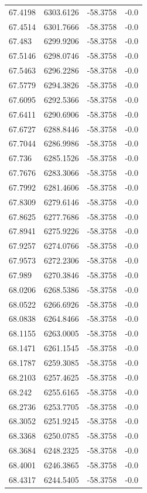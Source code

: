 \begin{table}[H]
\begin{tabular}{llll}
67.4198 & 6303.6126 & -58.3758 & -0.0 \\
67.4514 & 6301.7666 & -58.3758 & -0.0 \\
67.483 & 6299.9206 & -58.3758 & -0.0 \\
67.5146 & 6298.0746 & -58.3758 & -0.0 \\
67.5463 & 6296.2286 & -58.3758 & -0.0 \\
67.5779 & 6294.3826 & -58.3758 & -0.0 \\
67.6095 & 6292.5366 & -58.3758 & -0.0 \\
67.6411 & 6290.6906 & -58.3758 & -0.0 \\
67.6727 & 6288.8446 & -58.3758 & -0.0 \\
67.7044 & 6286.9986 & -58.3758 & -0.0 \\
67.736 & 6285.1526 & -58.3758 & -0.0 \\
67.7676 & 6283.3066 & -58.3758 & -0.0 \\
67.7992 & 6281.4606 & -58.3758 & -0.0 \\
67.8309 & 6279.6146 & -58.3758 & -0.0 \\
67.8625 & 6277.7686 & -58.3758 & -0.0 \\
67.8941 & 6275.9226 & -58.3758 & -0.0 \\
67.9257 & 6274.0766 & -58.3758 & -0.0 \\
67.9573 & 6272.2306 & -58.3758 & -0.0 \\
67.989 & 6270.3846 & -58.3758 & -0.0 \\
68.0206 & 6268.5386 & -58.3758 & -0.0 \\
68.0522 & 6266.6926 & -58.3758 & -0.0 \\
68.0838 & 6264.8466 & -58.3758 & -0.0 \\
68.1155 & 6263.0005 & -58.3758 & -0.0 \\
68.1471 & 6261.1545 & -58.3758 & -0.0 \\
68.1787 & 6259.3085 & -58.3758 & -0.0 \\
68.2103 & 6257.4625 & -58.3758 & -0.0 \\
68.242 & 6255.6165 & -58.3758 & -0.0 \\
68.2736 & 6253.7705 & -58.3758 & -0.0 \\
68.3052 & 6251.9245 & -58.3758 & -0.0 \\
68.3368 & 6250.0785 & -58.3758 & -0.0 \\
68.3684 & 6248.2325 & -58.3758 & -0.0 \\
68.4001 & 6246.3865 & -58.3758 & -0.0 \\
68.4317 & 6244.5405 & -58.3758 & -0.0 \\

\end{tabular}
\end{table}
